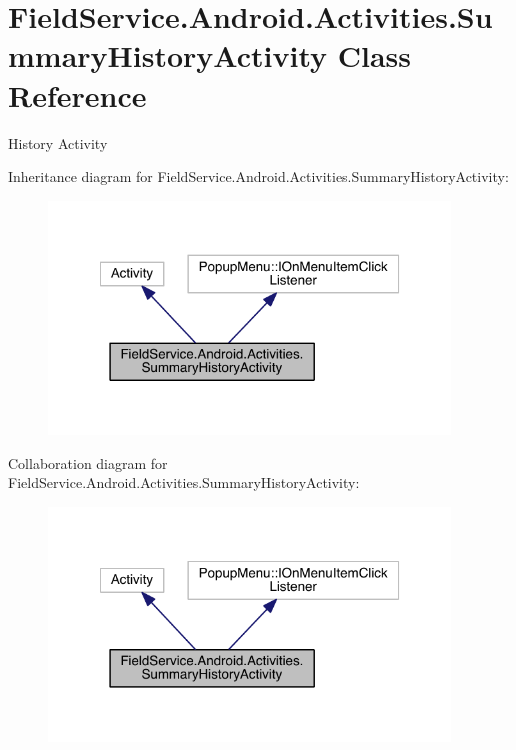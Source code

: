 \hypertarget{class_field_service_1_1_android_1_1_activities_1_1_summary_history_activity}{\section{Field\+Service.\+Android.\+Activities.\+Summary\+History\+Activity Class Reference}
\label{class_field_service_1_1_android_1_1_activities_1_1_summary_history_activity}
}


History Activity  




Inheritance diagram for Field\+Service.\+Android.\+Activities.\+Summary\+History\+Activity\+:
\nopagebreak
\begin{figure}[H]
\begin{center}
\leavevmode
\includegraphics[width=302pt]{class_field_service_1_1_android_1_1_activities_1_1_summary_history_activity__inherit__graph}
\end{center}
\end{figure}


Collaboration diagram for Field\+Service.\+Android.\+Activities.\+Summary\+History\+Activity\+:
\nopagebreak
\begin{figure}[H]
\begin{center}
\leavevmode
\includegraphics[width=302pt]{class_field_service_1_1_android_1_1_activities_1_1_summary_history_activity__coll__graph}
\end{center}
\end{figure}
